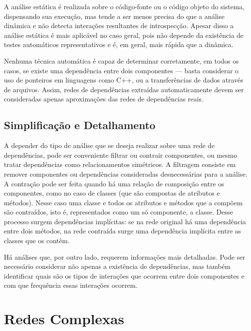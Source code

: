 \documentclass{article}
\begin{document}
A análise estática é realizada sobre o código-fonte ou o código objeto do sistema, dispensando sua execução, mas tende a ser menos precisa do que a análise dinâmica \cite{Landil1992} e não detecta interações resultantes de introspecção. Apesar disso a análise estática é mais aplicável no caso geral, pois não depende da existência de testes automáticos representativos e é, em geral, mais rápida que a dinâmica.

Nenhuma técnica automática é capaz de determinar corretamente, em todos os casos, se existe uma dependência entre dois componentes --- basta considerar o uso de ponteiros em linguagens como C++, ou a transferências de dados através de arquivos. Assim, redes de dependências extraídas automaticamente devem ser consideradas apenas aproximações das redes de dependências reais.

\subsection{Simplificação e Detalhamento}

A depender do tipo de análise que se deseja realizar sobre uma rede de dependências, pode ser conveniente filtrar ou contrair componentes, ou mesmo tratar dependências como relacionamentos simétricos. A filtragem consiste em remover componentes ou dependências consideradas desnecessárias para a análise. A contração pode ser feita quando há uma relação de composição entre os componentes, como no caso de classes (que são compostas de atributos e métodos). Nesse caso uma classe e todos os atributos e métodos que a compõem são contraídos, isto é, representados como um só componente, a classe. Desse processo surgem dependências implícitas: se na rede original há uma dependência entre dois métodos, na rede contraída surge uma dependência implícita entre as classes que os contêm. %

Há análises que, por outro lado, requerem informações mais detalhadas. Pode ser necessário considerar não apenas a existência de dependências, mas também identificar quais são os tipos de interações que ocorrem entre dois componentes e com que frequência essas interações ocorrem.

\section{Redes Complexas}
\end{document}
